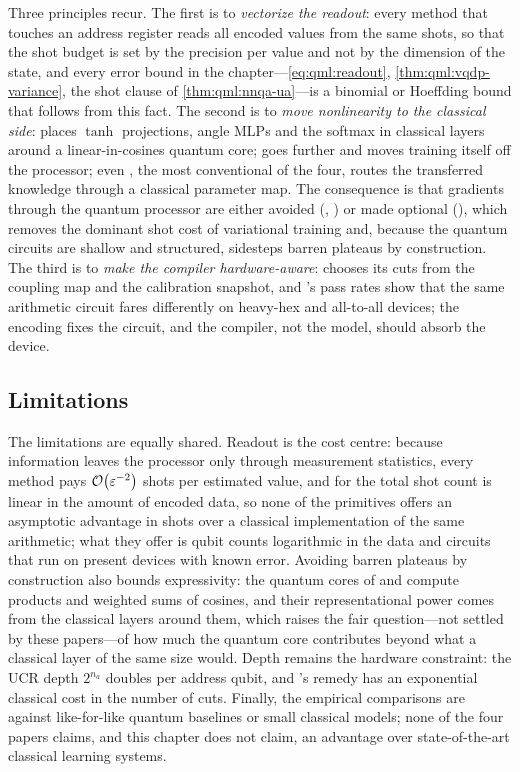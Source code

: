 Three principles recur. The first is to \emph{vectorize the readout}: every method that touches an address register reads all encoded values from the same shots, so that the shot budget is set by the precision per value and not by the dimension of the state, and every error bound in the chapter---\cref{eq:qml:readout}, \cref{thm:qml:vqdp-variance}, the shot clause of \cref{thm:qml:nnqa-ua}---is a binomial or Hoeffding bound that follows from this fact. The second is to \emph{move nonlinearity to the classical side}: \vqt{} places $\tanh$ projections, angle MLPs and the softmax in classical layers around a linear-in-cosines quantum core; \nnqa{} goes further and moves training itself off the processor; even \qpie{}, the most conventional of the four, routes the transferred knowledge through a classical parameter map. The consequence is that gradients through the quantum processor are either avoided (\vqt{}, \nnqa{}) or made optional (\qpie{}), which removes the dominant shot cost of variational training and, because the quantum circuits are shallow and structured, sidesteps barren plateaus by construction. The third is to \emph{make the compiler hardware-aware}: \shardq{} chooses its cuts from the coupling map and the calibration snapshot, and \nnqa{}'s pass rates show that the same arithmetic circuit fares differently on heavy-hex and all-to-all devices; the encoding fixes the circuit, and the compiler, not the model, should absorb the device.

\subsection{Limitations}\label{sec:qml:synthesis:limitations}

The limitations are equally shared. Readout is the cost centre: because information leaves the processor only through measurement statistics, every method pays $\mathcal{O}\!\left(\varepsilon^{-2}\right)$ shots per estimated value, and for \vqt{} the total shot count is linear in the amount of encoded data, so none of the primitives offers an asymptotic advantage in shots over a classical implementation of the same arithmetic; what they offer is qubit counts logarithmic in the data and circuits that run on present devices with known error. Avoiding barren plateaus by construction also bounds expressivity: the quantum cores of \vqt{} and \nnqa{} compute products and weighted sums of cosines, and their representational power comes from the classical layers around them, which raises the fair question---not settled by these papers---of how much the quantum core contributes beyond what a classical layer of the same size would. Depth remains the hardware constraint: the UCR depth $2^{n_a}$ doubles per address qubit, and \shardq{}'s remedy has an exponential classical cost in the number of cuts. Finally, the empirical comparisons are against like-for-like quantum baselines or small classical models; none of the four papers claims, and this chapter does not claim, an advantage over state-of-the-art classical learning systems.

